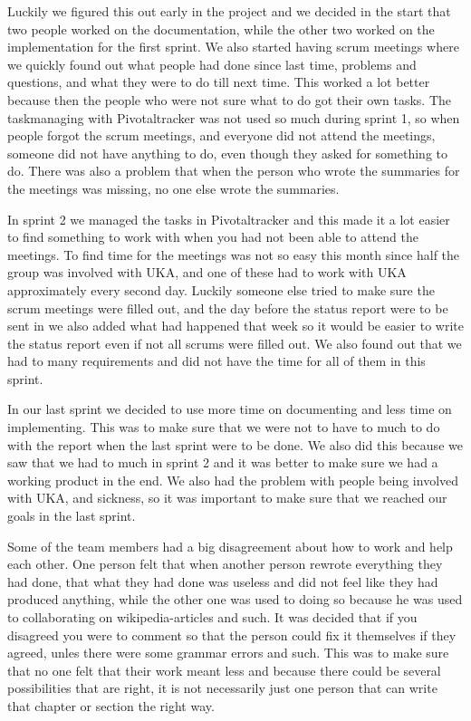 \documentclass{report}
\begin{document}
Luckily we figured this out early in the project and we decided in the start that two people worked on the documentation, while the other two worked on the implementation for the first sprint. We also started having scrum meetings where we quickly found out what people had done since last time, problems and questions, and what they were to do till next time. This worked a lot better because then the people who were not sure what to do got their own tasks. The taskmanaging with Pivotaltracker was not used so much during sprint 1, so when people forgot the scrum meetings, and everyone did not attend the meetings, someone did not have anything to do, even though they asked for something to do. There was also a problem that when the person who wrote the summaries for the meetings was missing, no one else wrote the summaries.

In sprint 2 we managed the tasks in Pivotaltracker and this made it a lot easier to find something to work with when you had not been able to attend the meetings. To find time for the meetings was not so easy this month since half the group was involved with UKA, and one of these had to work with UKA approximately every second day. Luckily someone else tried to make sure the scrum meetings were filled out, and the day before the status report were to be sent in we also added what had happened that week so it would be easier to write the status report even if not all scrums were filled out. We also found out that we had to many requirements and did not have the time for all of them in this sprint.

In our last sprint we decided to use more time on documenting and less time on implementing. This was to  make sure that we were not to have to much to do with the report when the last sprint were to be done. We also did this because we saw that we had to much in sprint 2 and it was better to make sure we had a working product in the end. We also had the problem with people being involved with UKA, and sickness, so it was important to make sure that we reached our goals in the last sprint.

Some of the team members had a big disagreement about how to work and help each other. One person felt that when another person rewrote everything they had done, that what they had done was useless and did not feel like they had produced anything, while the other one was used to doing so because he was used to collaborating on wikipedia-articles and such. It was decided that if you disagreed you were to comment so that the person could fix it themselves if they agreed, unles there were some grammar errors and such. This was to make sure that no one felt that their work meant less and because there could be several possibilities that are right, it is not necessarily just one person that can write that chapter or section the right way.
\end{document}
